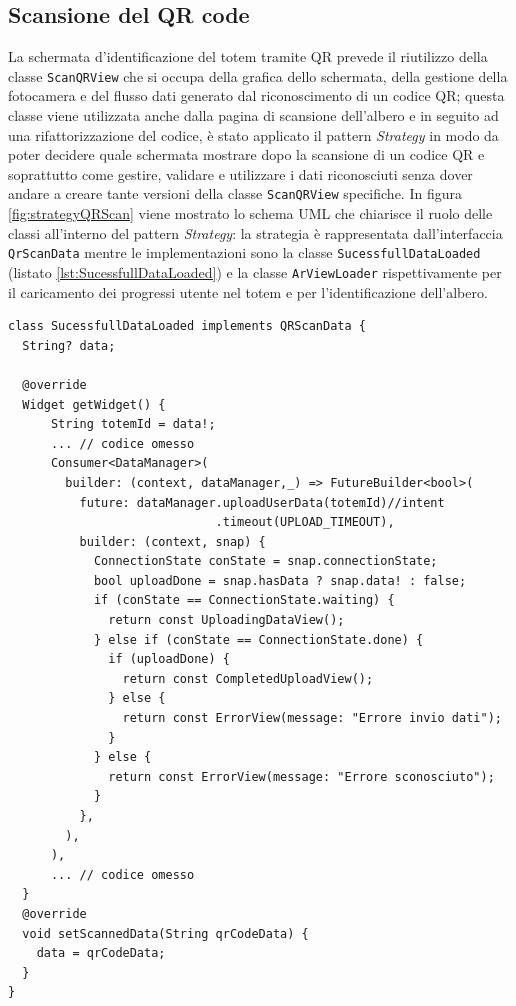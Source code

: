 \subsection{Scansione del QR code}
La schermata d'identificazione del totem tramite QR prevede il riutilizzo della classe \texttt{ScanQRView} che si occupa della grafica dello schermata, della gestione della fotocamera e del flusso dati generato dal riconoscimento di un codice QR; questa classe viene utilizzata anche dalla pagina di scansione dell'albero e in seguito ad una rifattorizzazione del codice, è stato applicato il pattern \textit{Strategy} in modo da poter decidere quale schermata mostrare dopo la scansione di un codice QR e soprattutto come gestire, validare e utilizzare i dati riconosciuti senza dover andare a creare tante versioni della classe \texttt{ScanQRView} specifiche. In figura \ref{fig:strategyQRScan} viene mostrato lo schema UML che chiarisce il ruolo delle classi all'interno del pattern \textit{Strategy}: la strategia è rappresentata dall'interfaccia \texttt{QrScanData} mentre le implementazioni sono la classe \texttt{SucessfullDataLoaded} (listato \ref{lst:SucessfullDataLoaded}) e la classe \texttt{ArViewLoader} rispettivamente per il caricamento dei progressi utente nel totem e per l'identificazione dell'albero.
\vspace{0.5em}
\begin{lstlisting}[style=FlutterStyle, caption={Codice rilevante della classe \texttt{SucessfullDataLoaded}.}, label={lst:SucessfullDataLoaded}]
class SucessfullDataLoaded implements QRScanData {
  String? data;

  @override
  Widget getWidget() {
      String totemId = data!;
      ... // codice omesso 
      Consumer<DataManager>(
        builder: (context, dataManager,_) => FutureBuilder<bool>(
          future: dataManager.uploadUserData(totemId)//intent
                             .timeout(UPLOAD_TIMEOUT),
          builder: (context, snap) {
            ConnectionState conState = snap.connectionState;
            bool uploadDone = snap.hasData ? snap.data! : false;
            if (conState == ConnectionState.waiting) {
              return const UploadingDataView();
            } else if (conState == ConnectionState.done) {
              if (uploadDone) {
                return const CompletedUploadView();
              } else {
                return const ErrorView(message: "Errore invio dati");
              }
            } else {
              return const ErrorView(message: "Errore sconosciuto");
            }
          },
        ),
      ),
      ... // codice omesso 
  }
  @override
  void setScannedData(String qrCodeData) {
    data = qrCodeData;
  }
}
\end{lstlisting}

